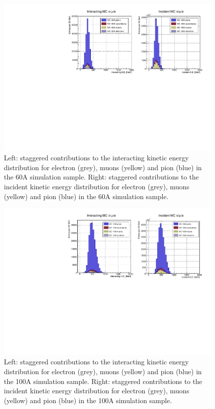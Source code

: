 \begin{figure}[p]
\centering
\includegraphics[width=\textwidth]{Chapter-5/Images/Background60A.pdf}
\caption{Left: staggered contributions to the interacting kinetic energy distribution for electron (grey), muons (yellow) and pion (blue) in the 60A simulation sample. Right: staggered contributions to the incident kinetic energy distribution for electron (grey), muons (yellow) and pion (blue) in the 60A simulation sample.  }
\label{fig:stag60A}
\end{figure}


\begin{figure}[p]
\centering
\includegraphics[width=\textwidth]{Chapter-5/Images/Background100A.pdf}
\caption{Left: staggered contributions to the interacting kinetic energy distribution for electron (grey), muons (yellow) and pion (blue) in the 100A simulation sample. Right: staggered contributions to the incident kinetic energy distribution for electron (grey), muons (yellow) and pion (blue) in the 100A simulation sample.  }
\label{fig:stag100A}
\end{figure}

